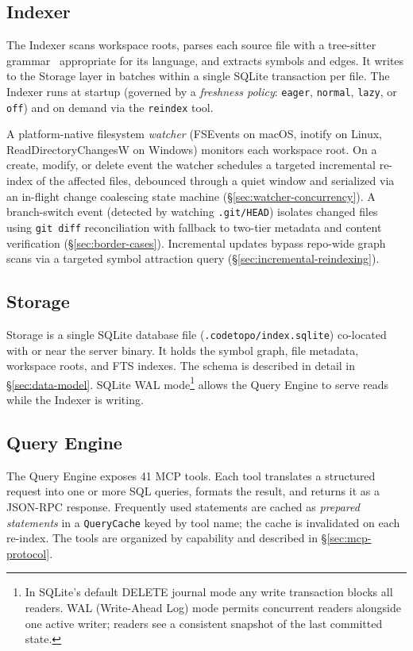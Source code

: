 \subsection{Indexer}

The Indexer scans workspace roots, parses each source file with a tree-sitter
grammar~\cite{brunsfeld2018treesitter} appropriate for its language, and
extracts symbols and edges. It writes to the Storage layer in batches within a
single SQLite transaction per file. The Indexer runs at startup (governed by a
\emph{freshness policy}: \texttt{eager}, \texttt{normal}, \texttt{lazy}, or
\texttt{off}) and on demand via the \texttt{reindex} tool.

A platform-native filesystem \emph{watcher} (FSEvents on macOS,
inotify on Linux, ReadDirectoryChangesW on Windows) monitors each workspace
root. On a create, modify, or delete event the watcher schedules a targeted incremental
re-index of the affected files, debounced through a quiet window and serialized via an
in-flight change coalescing state machine (\S\ref{sec:watcher-concurrency}). A branch-switch
event (detected by watching \texttt{.git/HEAD}) isolates changed files using \texttt{git diff}
reconciliation with fallback to two-tier metadata and content verification
(\S\ref{sec:border-cases}). Incremental updates bypass repo-wide graph scans via a targeted
symbol attraction query (\S\ref{sec:incremental-reindexing}).

\subsection{Storage}

Storage is a single SQLite database file (\texttt{.codetopo/index.sqlite})
co-located with or near the server binary. It holds the symbol graph, file
metadata, workspace roots, and FTS indexes. The schema is described in detail
in \S\ref{sec:data-model}. SQLite WAL mode\footnote{In SQLite's default
DELETE journal mode any write transaction blocks all readers. WAL
(Write-Ahead Log) mode permits concurrent readers alongside one active
writer; readers see a consistent snapshot of the last committed state.}
allows the Query Engine to serve
reads while the Indexer is writing.

\subsection{Query Engine}

The Query Engine exposes 41 MCP tools. Each tool translates a structured
request into one or more SQL queries, formats the result, and returns it as a
JSON-RPC response. Frequently used statements are cached as \emph{prepared
statements} in a \texttt{QueryCache} keyed by tool name; the cache is
invalidated on each re-index. The tools are organized by capability and
described in \S\ref{sec:mcp-protocol}.


